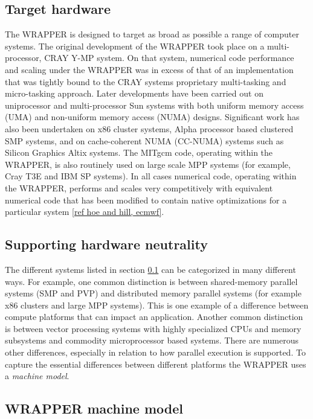\subsection{Target hardware}
\label{sect:target_hardware}

The WRAPPER is designed to target as broad as possible a range of
computer systems.  The original development of the WRAPPER took place
on a multi-processor, CRAY Y-MP system. On that system, numerical code
performance and scaling under the WRAPPER was in excess of that of an
implementation that was tightly bound to the CRAY systems proprietary
multi-tasking and micro-tasking approach. Later developments have been
carried out on uniprocessor and multi-processor Sun systems with both
uniform memory access (UMA) and non-uniform memory access (NUMA)
designs.  Significant work has also been undertaken on x86 cluster
systems, Alpha processor based clustered SMP systems, and on
cache-coherent NUMA (CC-NUMA) systems such as Silicon Graphics Altix
systems.  The MITgcm code, operating within the WRAPPER, is also
routinely used on large scale MPP systems (for example, Cray T3E and
IBM SP systems). In all cases numerical code, operating within the
WRAPPER, performs and scales very competitively with equivalent
numerical code that has been modified to contain native optimizations
for a particular system \ref{ref hoe and hill, ecmwf}.

\subsection{Supporting hardware neutrality}

The different systems listed in section \ref{sect:target_hardware} can
be categorized in many different ways. For example, one common
distinction is between shared-memory parallel systems (SMP and PVP)
and distributed memory parallel systems (for example x86 clusters and
large MPP systems). This is one example of a difference between
compute platforms that can impact an application. Another common
distinction is between vector processing systems with highly
specialized CPUs and memory subsystems and commodity microprocessor
based systems. There are numerous other differences, especially in
relation to how parallel execution is supported. To capture the
essential differences between different platforms the WRAPPER uses a
{\it machine model}.

\subsection{WRAPPER machine model}

